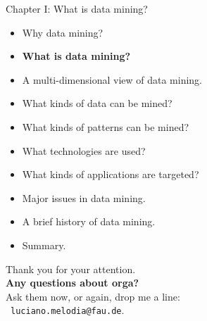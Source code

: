 \documentclass[aspectratio=169,t]{beamer}
\begin{document}
  { 
    \begin{frame}{Chapter I: What is data mining?}
        \begin{itemize}
            \item Why data mining?
            \item \textbf{What is data mining?}
            \item A multi-dimensional view of data mining.
            \item What kinds of data can be mined?
            \item What kinds of patterns can be mined?
            \item What technologies are used?
            \item What kinds of applications are targeted?
            \item Major issues in data mining.
            \item A brief history of data mining.
            \item Summary.
        \end{itemize}
    \end{frame}
  }

  { %
    \begin{frame}[c]
      \begin{center}
        Thank you for your attention.\\
        {\bf Any questions about orga?}\\[0.5cm]
        Ask them now, or again, drop me a line: \\ 
        \faSendO \ \texttt{luciano.melodia@fau.de}.
      \end{center}
    \end{frame}
  }
\end{document}
